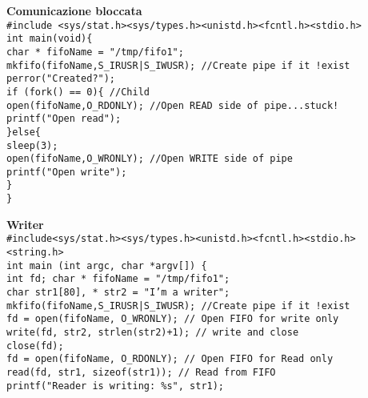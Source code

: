 \begin{flushleft}
\begin{flushleft}
    \textbf{Comunicazione bloccata}\\
    \texttt{\#include <sys/stat.h><sys/types.h><unistd.h><fcntl.h><stdio.h>\\
            int main(void)\{\\
            \halftab char * fifoName = "/tmp/fifo1";\\
            \halftab mkfifo(fifoName,S\_IRUSR|S\_IWUSR); //Create pipe if it !exist\\
            \halftab perror("Created?");\\
            \halftab if (fork() == 0)\{ //Child\\
            \tab open(fifoName,O\_RDONLY); //Open READ side of pipe...stuck!\\
            \tab printf("Open read\n");\\
            \halftab \}else\{\\
            \tab sleep(3); \\
            \tab open(fifoName,O\_WRONLY); //Open WRITE side of pipe\\
            \tab printf("Open write\n");\\
            \halftab \}\\
            \}
            }
  \end{flushleft}
  \begin{flushleft}
    \textbf{Writer} \\
    \texttt{\#include<sys/stat.h><sys/types.h><unistd.h><fcntl.h><stdio.h><string.h>\\
            int main (int argc, char *argv[]) \{\\
            \halftab int fd; char * fifoName = "/tmp/fifo1"; \\
            \halftab char str1[80], * str2 = "I’m a writer";\\
            \halftab mkfifo(fifoName,S\_IRUSR|S\_IWUSR); //Create pipe if it !exist\\
            \halftab fd = open(fifoName, O\_WRONLY); // Open FIFO for write only\\
            \halftab write(fd, str2, strlen(str2)+1); // write and close\\
            \halftab close(fd);\\
            \halftab fd = open(fifoName, O\_RDONLY); // Open FIFO for Read only\\
            \halftab read(fd, str1, sizeof(str1)); // Read from FIFO\\
            \halftab printf("Reader is writing: \%s\n", str1);\\
}
\end{flushleft}
\end{flushleft}
